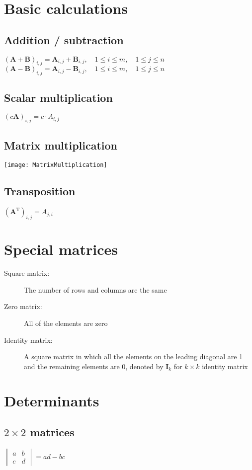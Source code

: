 \section{Basic calculations}
\subsection{Addition / subtraction}
$(\mathbf {A}+\mathbf {B})_{i,j}=\mathbf {A}_{i,j}+{\mathbf {B}}_{i,j},\quad 1\leq i\leq m,\quad 1\leq j\leq n$\\
$(\mathbf {A}-\mathbf {B})_{i,j}=\mathbf {A}_{i,j}-{\mathbf {B}}_{i,j},\quad 1\leq i\leq m,\quad 1\leq j\leq n$
\subsection{Scalar multiplication}
$(c\mathbf{A})_{i,j}=c\cdot A_{i,j}$
\subsection{Matrix multiplication}
\texttt{[image: MatrixMultiplication]}

\subsection{Transposition}
$(\mathbf{A}^\mathrm{T})_{i,j}=A_{j,i}$

\section{Special matrices}
\begin{description}
	\item[Square matrix:] The number of rows and columns are the same
	\item[Zero matrix:] All of the elements are zero
	\item[Identity matrix:] A square matrix in which all the elements on the leading diagonal are 1 and the remaining elements are 0, denoted by $\mathbf{I}_k$ for $k\times k$ identity matrix
\end{description}


\section{Determinants}

\subsection{$2\times2$ matrices}
$\begin{vmatrix}a&b\\c&d\end{vmatrix}=ad-bc$

